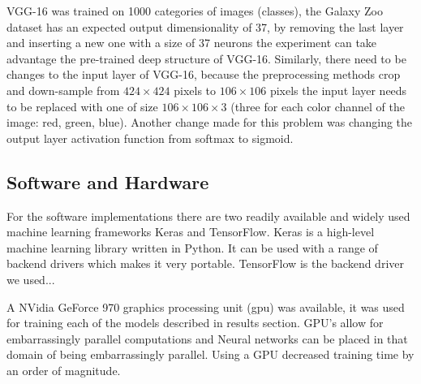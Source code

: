
VGG-16 was trained on 1000 categories of images (classes), the Galaxy Zoo dataset has an expected output dimensionality of 37, by removing the last layer and inserting a new one with a size of 37 neurons the experiment can take advantage the pre-trained deep structure of VGG-16. Similarly, there need to be changes to the input layer of VGG-16, because the preprocessing methods crop and down-sample from $424 \times 424$ pixels to $106 \times 106$ pixels the input layer needs to be replaced with one of size $106 \times 106 \times 3$ (three for each color channel of the image: red, green, blue). Another change made for this problem was changing the output layer activation function from softmax to sigmoid.

\subsection{Software and Hardware}
For the software implementations there are two readily available and widely used machine learning frameworks Keras and TensorFlow. Keras is a high-level machine learning library written in Python. It can be used with a range of backend drivers which makes it very portable. TensorFlow is the backend driver we used...

A NVidia GeForce 970 graphics processing unit (gpu) was available, it was used for training each of the models described in results section. GPU's allow for embarrassingly parallel computations and Neural networks can be placed in that domain of being embarrassingly parallel. Using a GPU decreased training time by an order of magnitude.
